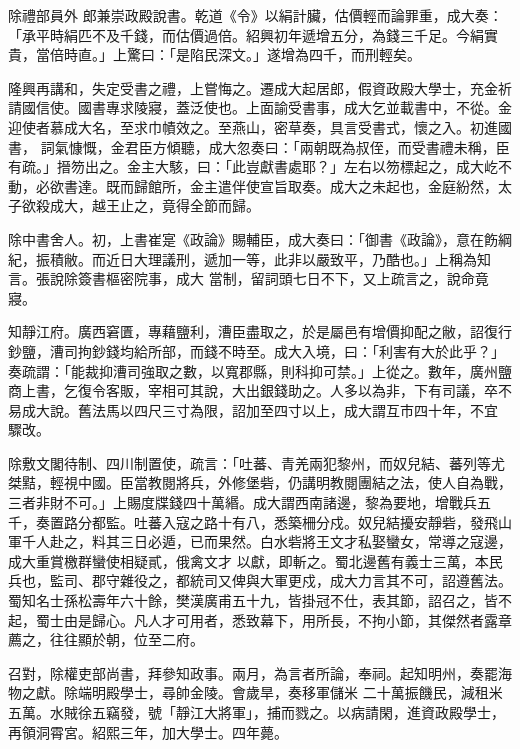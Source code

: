 \begin{pinyinscope}
 除禮部員外
 郎兼崇政殿說書。乾道《令》以絹計臟，估價輕而論罪重，成大奏：「承平時絹匹不及千錢，而估價過倍。紹興初年遞增五分，為錢三千足。今絹實貴，當倍時直。」上驚曰：「是陷民深文。」遂增為四千，而刑輕矣。



 隆興再講和，失定受書之禮，上嘗悔之。遷成大起居郎，假資政殿大學士，充金祈請國信使。國書專求陵寢，蓋泛使也。上面諭受書事，成大乞並載書中，不從。金迎使者慕成大名，至求巾幘效之。至燕山，密草奏，具言受書式，懷之入。初進國書，
 詞氣慷慨，金君臣方傾聽，成大忽奏曰：「兩朝既為叔侄，而受書禮未稱，臣有疏。」搢笏出之。金主大駭，曰：「此豈獻書處耶？」左右以笏標起之，成大屹不動，必欲書達。既而歸館所，金主遣伴使宣旨取奏。成大之未起也，金庭紛然，太子欲殺成大，越王止之，竟得全節而歸。



 除中書舍人。初，上書崔寔《政論》賜輔臣，成大奏曰：「御書《政論》，意在飭綱紀，振積敝。而近日大理議刑，遞加一等，此非以嚴致平，乃酷也。」上稱為知言。張說除簽書樞密院事，成大
 當制，留詞頭七日不下，又上疏言之，說命竟寢。



 知靜江府。廣西窘匱，專藉鹽利，漕臣盡取之，於是屬邑有增價抑配之敝，詔復行鈔鹽，漕司拘鈔錢均給所部，而錢不時至。成大入境，曰：「利害有大於此乎？」奏疏謂：「能裁抑漕司強取之數，以寬郡縣，則科抑可禁。」上從之。數年，廣州鹽商上書，乞復令客販，宰相可其說，大出銀錢助之。人多以為非，下有司議，卒不易成大說。舊法馬以四尺三寸為限，詔加至四寸以上，成大謂互市四十年，不宜
 驟改。



 除敷文閣待制、四川制置使，疏言：「吐蕃、青羌兩犯黎州，而奴兒結、蕃列等尤桀黠，輕視中國。臣當教閱將兵，外修堡砦，仍講明教閱團結之法，使人自為戰，三者非財不可。」上賜度牒錢四十萬緡。成大謂西南諸邊，黎為要地，增戰兵五千，奏置路分都監。吐蕃入寇之路十有八，悉築柵分戍。奴兒結擾安靜砦，發飛山軍千人赴之，料其三日必遁，已而果然。白水砦將王文才私娶蠻女，常導之寇邊，成大重賞檄群蠻使相疑貳，俄禽文才
 以獻，即斬之。蜀北邊舊有義士三萬，本民兵也，監司、郡守雜役之，都統司又俾與大軍更戍，成大力言其不可，詔遵舊法。蜀知名士孫松壽年六十餘，樊漢廣甫五十九，皆掛冠不仕，表其節，詔召之，皆不起，蜀士由是歸心。凡人才可用者，悉致幕下，用所長，不拘小節，其傑然者露章薦之，往往顯於朝，位至二府。



 召對，除權吏部尚書，拜參知政事。兩月，為言者所論，奉祠。起知明州，奏罷海物之獻。除端明殿學士，尋帥金陵。會歲旱，奏移軍儲米
 二十萬振饑民，減租米五萬。水賊徐五竊發，號「靜江大將軍」，捕而戮之。以病請閑，進資政殿學士，再領洞霄宮。紹熙三年，加大學士。四年薨。




\end{pinyinscope}
